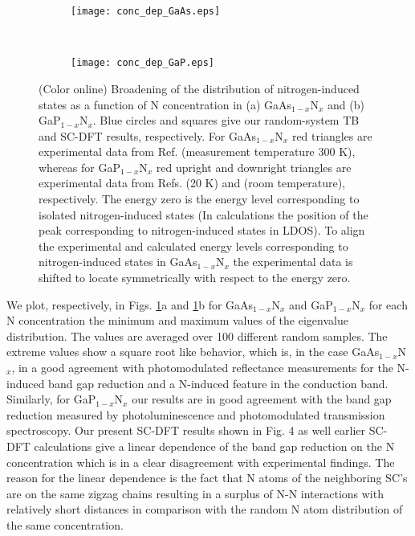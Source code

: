 \documentclass[aps,prb,10pt,twocolumn,groupedaddress]{revtex4-1}
\begin{document}
\begin{figure}[!t]
  \centering
  \begin{subfigure}[]{0.38\textwidth}
    \centering
    \texttt{[image: conc\_dep\_GaAs.eps]}
    \caption{}
  \end{subfigure}\\
  \vspace{0.2cm}
  \centering
  \begin{subfigure}[]{0.38\textwidth}
    \centering
    \texttt{[image: conc\_dep\_GaP.eps]}
    \caption{}
  \end{subfigure}
  \caption{(Color online) Broadening of the distribution of nitrogen-induced 
states as a function of N concentration in (a) GaAs$_{1-x}$N$_x$  and (b) 
GaP$_{1-x}$N$_x$. Blue circles and 
squares give our random-system TB and SC-DFT results, respectively. For 
GaAs$_{1-x}$N$_x$ red triangles are experimental data from Ref. 
 (measurement temperature 300  K), whereas for  
GaP$_{1-x}$N$_x$  red upright and downright triangles  are experimental data 
from Refs.  (20 K) and  
(room temperature),
respectively. The energy zero is the energy level corresponding to isolated
nitrogen-induced states (In calculations the position of the peak corresponding
to nitrogen-induced states in LDOS). To align the experimental and calculated 
energy levels corresponding to nitrogen-induced states in GaAs$_{1-x}$N$_x$ the 
experimental data is shifted to locate symmetrically with respect to the energy 
zero.}
\label{fig:splitting}
\end{figure} 
We plot, respectively, in Figs. \ref{fig:splitting}a and 
\ref{fig:splitting}b for GaAs$_{1-x}$N$_x$ and GaP$_{1-x}$N$_x$ for each
N concentration the minimum and maximum values of the eigenvalue distribution.
The values are averaged over 100 different random samples. 
The extreme values show a square root like behavior, which is, in the case 
GaAs$_{1-x}$N$_x$, in a good agreement with photomodulated reflectance 
measurements for the N-induced band gap reduction and a N-induced feature in the
conduction band.\cite{klar} Similarly, for GaP$_{1-x}$N$_x$  our results are in 
good agreement with the band gap reduction measured by 
photoluminescence\cite{yaguchi} and photomodulated transmission 
spectroscopy.\cite{shan2} Our 
present SC-DFT results shown in Fig. 4 as well earlier SC-DFT
calculations\cite{zunger1,virkkala} give a linear dependence of the band gap 
reduction on the N concentration which is in a clear disagreement with 
experimental findings. The reason for the linear dependence is the fact that N 
atoms of the neighboring SC's are on the same zigzag chains resulting in a 
surplus of N-N interactions with relatively short distances in comparison with
the random N atom distribution of the same concentration.
\end{document}
